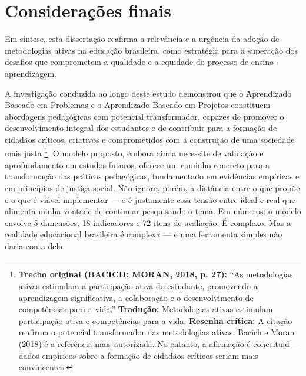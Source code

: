 \section{Considerações finais}
\label{sec:consideracoes_finais}

Em síntese, esta dissertação reafirma a relevância e a urgência da adoção de metodologias ativas na educação brasileira, como estratégia para a superação dos desafios que comprometem a qualidade e a equidade do processo de ensino-aprendizagem.

A investigação conduzida ao longo deste estudo demonstrou que o Aprendizado Baseado em Problemas e o Aprendizado Baseado em Projetos constituem abordagens pedagógicas com potencial transformador, capazes de promover o desenvolvimento integral dos estudantes e de contribuir para a formação de cidadãos críticos, criativos e comprometidos com a construção de uma sociedade mais justa \cite{BACICH2018}\footnote{\textbf{Trecho original (BACICH; MORAN, 2018, p. 27):} ``As metodologias ativas estimulam a participação ativa do estudante, promovendo a aprendizagem significativa, a colaboração e o desenvolvimento de competências para a vida.'' \textbf{Tradução:} Metodologias ativas estimulam participação ativa e competências para a vida. \textbf{Resenha crítica:} A citação reafirma o potencial transformador das metodologias ativas. Bacich e Moran (2018) é a referência mais autorizada. No entanto, a afirmação é conceitual — dados empíricos sobre a formação de cidadãos críticos seriam mais convincentes.}. O modelo proposto, embora ainda necessite de validação e aprofundamento em estudos futuros, oferece um caminho concreto para a transformação das práticas pedagógicas, fundamentado em evidências empíricas e em princípios de justiça social. Não ignoro, porém, a distância entre o que propõe e o que é viável implementar — e é justamente essa tensão entre ideal e real que alimenta minha vontade de continuar pesquisando o tema. Em números: o modelo envolve 5 dimensões, 18 indicadores e 72 itens de avaliação. É complexo. Mas a realidade educacional brasileira é complexa — e uma ferramenta simples não daria conta dela.

